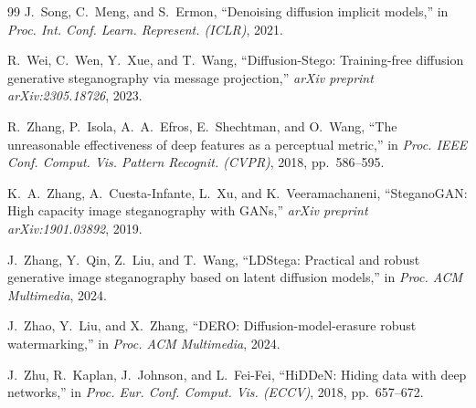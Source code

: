 \documentclass[journal]{IEEEtran}
\begin{document}
\begin{thebibliography}{99}
J.~Song, C.~Meng, and S.~Ermon, ``Denoising diffusion implicit
models,'' in \emph{Proc. Int. Conf. Learn. Represent. (ICLR)},
2021.

R.~Wei, C.~Wen, Y.~Xue, and T.~Wang, ``Diffusion-Stego: Training-free
diffusion generative steganography via message projection,''
\emph{arXiv preprint arXiv:2305.18726}, 2023.

R.~Zhang, P.~Isola, A.~A.~Efros, E.~Shechtman, and O.~Wang, ``The
unreasonable effectiveness of deep features as a perceptual
metric,'' in \emph{Proc. IEEE Conf. Comput. Vis. Pattern Recognit.
(CVPR)}, 2018, pp.~586--595.

K.~A.~Zhang, A.~Cuesta-Infante, L.~Xu, and K.~Veeramachaneni,
``SteganoGAN: High capacity image steganography with GANs,''
\emph{arXiv preprint arXiv:1901.03892}, 2019.

J.~Zhang, Y.~Qin, Z.~Liu, and T.~Wang, ``LDStega: Practical and
robust generative image steganography based on latent diffusion
models,'' in \emph{Proc. ACM Multimedia}, 2024.

J.~Zhao, Y.~Liu, and X.~Zhang, ``DERO: Diffusion-model-erasure
robust watermarking,'' in \emph{Proc. ACM Multimedia}, 2024.

J.~Zhu, R.~Kaplan, J.~Johnson, and L.~Fei-Fei, ``HiDDeN: Hiding
data with deep networks,'' in \emph{Proc. Eur. Conf. Comput. Vis.
(ECCV)}, 2018, pp.~657--672.

\end{thebibliography}
\end{document}

